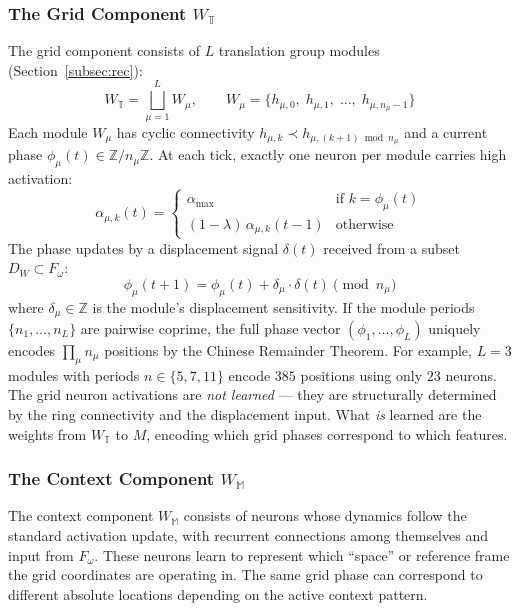 \documentclass[11pt]{article}
\begin{document}
\subsubsection{The Grid Component $W_\mathbb{T}$}
The grid component consists of $L$ translation group modules (Section~\ref{subsec:rec}):
\begin{equation}
    W_\mathbb{T} = \bigsqcup_{\mu=1}^{L} W_\mu, \qquad W_\mu = \{h_{\mu,0},\; h_{\mu,1},\; \ldots,\; h_{\mu, n_\mu - 1}\}
\end{equation}
Each module $W_\mu$ has cyclic connectivity $h_{\mu,k} \prec h_{\mu, (k+1) \bmod n_\mu}$ and a current phase $\phi_\mu(t) \in \mathbb{Z}/n_\mu\mathbb{Z}$. At each tick, exactly one neuron per module carries high activation:
\begin{equation}
    \alpha_{\mu, k}(t) = \begin{cases} \alpha_{\max} & \text{if } k = \phi_\mu(t) \\ (1-\lambda)\,\alpha_{\mu,k}(t-1) & \text{otherwise} \end{cases}
\end{equation}
The phase updates by a displacement signal $\delta(t)$ received from a subset $D_W \subset F_\omega$:
\begin{equation}
    \phi_\mu(t+1) = \phi_\mu(t) + \delta_\mu \cdot \delta(t) \pmod{n_\mu}
\end{equation}
where $\delta_\mu \in \mathbb{Z}$ is the module's displacement sensitivity. If the module periods $\{n_1, \ldots, n_L\}$ are pairwise coprime, the full phase vector $(\phi_1, \ldots, \phi_L)$ uniquely encodes $\prod_\mu n_\mu$ positions by the Chinese Remainder Theorem. For example, $L = 3$ modules with periods $n \in \{5, 7, 11\}$ encode $385$ positions using only $23$ neurons.\\

The grid neuron activations are \textit{not learned} --- they are structurally determined by the ring connectivity and the displacement input. What \textit{is} learned are the weights from $W_\mathbb{T}$ to $M$, encoding which grid phases correspond to which features.

\subsubsection{The Context Component $W_\mathbb{M}$}
The context component $W_\mathbb{M}$ consists of neurons whose dynamics follow the standard activation update, with recurrent connections among themselves and input from $F_\omega$. These neurons learn to represent which ``space'' or reference frame the grid coordinates are operating in. The same grid phase can correspond to different absolute locations depending on the active context pattern.\\
\end{document}
